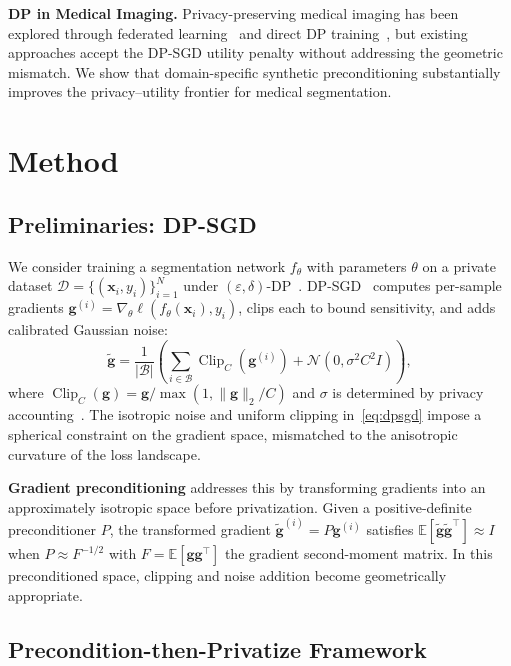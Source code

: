 \documentclass[runningheads]{llncs}
\newcommand{\E}{\mathbb{E}}
\newcommand{\bx}{\mathbf{x}}
\newcommand{\bg}{\mathbf{g}}
\DeclareMathOperator{\Clip}{Clip}
\begin{document}
\textbf{DP in Medical Imaging.}
Privacy-preserving medical imaging has been explored through federated learning~\cite{kaissis2021end,adnan2022federated} and direct DP training~\cite{ziller2021medical}, but existing approaches accept the DP-SGD utility penalty without addressing the geometric mismatch. We show that domain-specific synthetic preconditioning substantially improves the privacy--utility frontier for medical segmentation.

\section{Method}
\label{sec:method}

\subsection{Preliminaries: DP-SGD}
\label{subsec:prelim}

We consider training a segmentation network $f_\theta$ with parameters $\theta$ on a private dataset $\mathcal{D}=\{(\bx_i,y_i)\}_{i=1}^N$ under $(\varepsilon,\delta)$-DP~\cite{Dwork2006}. DP-SGD~\cite{Abadi_2016} computes per-sample gradients $\bg^{(i)}=\nabla_\theta \ell(f_\theta(\bx_i),y_i)$, clips each to bound sensitivity, and adds calibrated Gaussian noise:
\begin{equation}
\label{eq:dpsgd}
\tilde{\bg} = \frac{1}{|\mathcal{B}|}\left(\sum_{i\in\mathcal{B}} \Clip_C(\bg^{(i)}) + \mathcal{N}(0,\sigma^2 C^2 I)\right),
\end{equation}
where $\Clip_C(\bg)=\bg/\max(1,\|\bg\|_2/C)$ and $\sigma$ is determined by privacy accounting~\cite{Mironov_2017}. The isotropic noise and uniform clipping in~\eqref{eq:dpsgd} impose a spherical constraint on the gradient space, mismatched to the anisotropic curvature of the loss landscape.

\textbf{Gradient preconditioning} addresses this by transforming gradients into an approximately isotropic space before privatization. Given a positive-definite preconditioner $P$, the transformed gradient $\tilde{\bg}^{(i)}=P\bg^{(i)}$ satisfies $\E[\tilde{\bg}\tilde{\bg}^\top]\approx I$ when $P\approx F^{-1/2}$ with $F=\E[\bg\bg^\top]$ the gradient second-moment matrix. In this preconditioned space, clipping and noise addition become geometrically appropriate.

\subsection{Precondition-then-Privatize Framework}
\label{subsec:framework}
\end{document}
